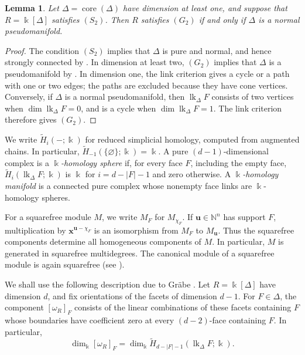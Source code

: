 \documentclass[a4paper,11pt]{amsart}
\theoremstyle{plain}
\newtheorem{lemma}[theorem]{Lemma}
\theoremstyle{definition}
\theoremstyle{remark}
\DeclareMathOperator{\core}{core}
\newcommand{\kk}{\Bbbk}
\newcommand{\NN}{\mathbb N}
\begin{document}
\begin{lemma}\label{lem:g2-pseudomanifold}
Let $\Delta=\core(\Delta)$ have dimension at least one, and suppose that $R=\kk[\Delta]$ satisfies $(S_2)$. Then $R$ satisfies $(G_2)$ if and only if $\Delta$ is a normal pseudomanifold.
\end{lemma}
\begin{proof}
The condition $(S_2)$ implies that $\Delta$ is pure and normal, and hence strongly connected by \cite[proof of Proposition~11.7]{Bjo95}. In dimension at least two, $(G_2)$ implies that $\Delta$ is a pseudomanifold by \cite[Proposition~4.13]{KM26}. In dimension one, the link criterion gives a cycle or a path with one or two edges; the paths are excluded because they have cone vertices. Conversely, if $\Delta$ is a normal pseudomanifold, then $\operatorname{lk}_\Delta F$ consists of two vertices when $\dim\operatorname{lk}_\Delta F=0$, and is a cycle when $\dim\operatorname{lk}_\Delta F=1$. The link criterion therefore gives $(G_2)$.
\end{proof}

We write $\widetilde H_i(-;\kk)$ for reduced simplicial homology, computed from augmented chains. In particular, $\widetilde H_{-1}(\{\varnothing\};\kk)=\kk$. A pure $(d-1)$-dimensional complex is a \emph{$\kk$-homology sphere} if, for every face $F$, including the empty face, $\widetilde H_i(\operatorname{lk}_\Delta F;\kk)$ is $\kk$ for $i=d-|F|-1$ and zero otherwise. A \emph{$\kk$-homology manifold} is a connected pure complex whose nonempty face links are $\kk$-homology spheres.

For a squarefree module $M$, we write $M_F$ for $M_{\chi_F}$. If $\mathbf{u}\in\NN^n$ has support $F$, multiplication by $\mathbf{x}^{\mathbf{u}-\chi_F}$ is an isomorphism from $M_F$ to $M_{\mathbf{u}}$. Thus the squarefree components determine all homogeneous components of $M$. In particular, $M$ is generated in squarefree multidegrees. The canonical module of a squarefree module is again squarefree (see \cite[Section~2 and Theorem~2.6]{Yan00}).

We shall use the following description due to Gr\"abe \cite{Gra84}. Let $R=\kk[\Delta]$ have dimension $d$, and fix orientations of the facets of dimension $d-1$. For $F\in\Delta$, the component $[\omega_R]_F$ consists of the linear combinations of these facets containing $F$ whose boundaries have coefficient zero at every $(d-2)$-face containing $F$. In particular,
\[
\dim_\kk[\omega_R]_F=\dim_\kk\widetilde H_{d-|F|-1}(\operatorname{lk}_\Delta F;\kk).
\]
\end{document}
